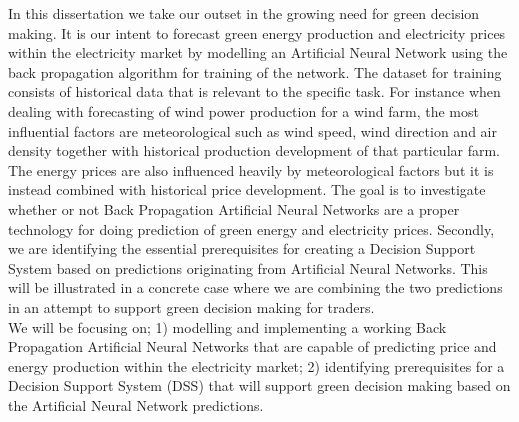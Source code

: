 In this dissertation we take our outset in the growing need for green decision making. It is our intent to forecast green energy production and electricity prices within the electricity market by modelling an Artificial Neural Network using the back propagation algorithm for training of the network. The dataset for training consists of historical data that is relevant to the specific task. For instance when dealing with forecasting of wind power production for a wind farm, the most influential factors are meteorological such as wind speed, wind direction and air density together with historical production development of that particular farm. The energy prices are also influenced heavily by meteorological factors but it is instead combined with historical price development.
The goal is to investigate whether or not Back Propagation Artificial Neural Networks are a proper technology for doing prediction of green energy and electricity prices. Secondly, we are identifying the essential prerequisites for creating a Decision Support System based on predictions originating from Artificial Neural Networks. This will be illustrated in a concrete case where we are combining the two predictions in an attempt to support green decision making for traders.
\\[0.5cm]
We will be focusing on; 1) modelling and implementing a working Back Propagation Artificial Neural Networks that are capable of predicting price and energy production within the electricity market; 2) identifying prerequisites for a Decision Support System (DSS) that will support green decision making based on the Artificial Neural Network predictions.